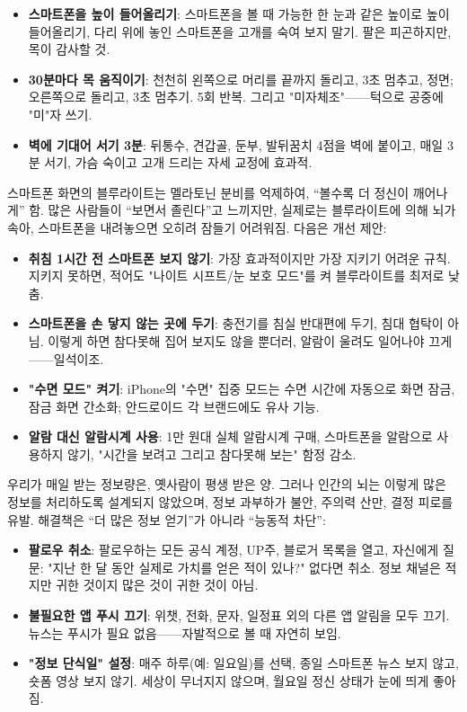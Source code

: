 \begin{itemize}
  \item \textbf{스마트폰을 높이 들어올리기}: 스마트폰을 볼 때 가능한 한 눈과 같은 높이로 높이 들어올리기, 다리 위에 놓인 스마트폰을 고개를 숙여 보지 말기. 팔은 피곤하지만, 목이 감사할 것.
  \item \textbf{30분마다 목 움직이기}: 천천히 왼쪽으로 머리를 끝까지 돌리고, 3초 멈추고, 정면; 오른쪽으로 돌리고, 3초 멈추기. 5회 반복. 그리고 "미자체조"——턱으로 공중에 "미"자 쓰기.
  \item \textbf{벽에 기대어 서기 3분}: 뒤통수, 견갑골, 둔부, 발뒤꿈치 4점을 벽에 붙이고, 매일 3분 서기, 가슴 숙이고 고개 드리는 자세 교정에 효과적.
\end{itemize}


스마트폰 화면의 블루라이트는 멜라토닌 분비를 억제하여, “볼수록 더 정신이 깨어나게” 함. 많은 사람들이 “보면서 졸린다”고 느끼지만, 실제로는 블루라이트에 의해 뇌가 속아, 스마트폰을 내려놓으면 오히려 잠들기 어려워짐. 다음은 개선 제안:

\begin{itemize}
  \item \textbf{취침 1시간 전 스마트폰 보지 않기}: 가장 효과적이지만 가장 지키기 어려운 규칙. 지키지 못하면, 적어도 "나이트 시프트/눈 보호 모드"를 켜 블루라이트를 최저로 낮춤.
  \item \textbf{스마트폰을 손 닿지 않는 곳에 두기}: 충전기를 침실 반대편에 두기, 침대 협탁이 아님. 이렇게 하면 참다못해 집어 보지도 않을 뿐더러, 알람이 울려도 일어나야 끄게——일석이조.
  \item \textbf{"수면 모드" 켜기}: iPhone의 "수면" 집중 모드는 수면 시간에 자동으로 화면 잠금, 잠금 화면 간소화; 안드로이드 각 브랜드에도 유사 기능.
  \item \textbf{알람 대신 알람시계 사용}: 1만 원대 실체 알람시계 구매, 스마트폰을 알람으로 사용하지 않기, "시간을 보려고 그리고 참다못해 보는" 함정 감소.
\end{itemize}


우리가 매일 받는 정보량은, 옛사람이 평생 받은 양. 그러나 인간의 뇌는 이렇게 많은 정보를 처리하도록 설계되지 않았으며, 정보 과부하가 불안, 주의력 산만, 결정 피로를 유발. 해결책은 “더 많은 정보 얻기”가 아니라 “능동적 차단”:

\begin{itemize}
  \item \textbf{팔로우 취소}: 팔로우하는 모든 공식 계정, UP주, 블로거 목록을 열고, 자신에게 질문: "지난 한 달 동안 실제로 가치를 얻은 적이 있나?" 없다면 취소. 정보 채널은 적지만 귀한 것이지 많은 것이 귀한 것이 아님.
  \item \textbf{불필요한 앱 푸시 끄기}: 위챗, 전화, 문자, 일정표 외의 다른 앱 알림을 모두 끄기. 뉴스는 푸시가 필요 없음——자발적으로 볼 때 자연히 보임.
  \item \textbf{"정보 단식일" 설정}: 매주 하루(예: 일요일)를 선택, 종일 스마트폰 뉴스 보지 않고, 숏폼 영상 보지 않기. 세상이 무너지지 않으며, 월요일 정신 상태가 눈에 띄게 좋아짐.
\end{itemize}


